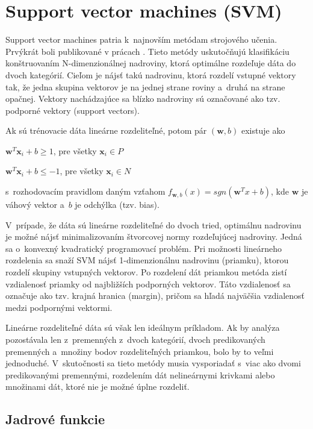 \section {Support vector machines (SVM)}

Support vector machines patria k~najnovším metódam strojového učenia. Prvýkrát boli publikované v prácach \cite{svm} \cite{svm2}. Tieto metódy uskutočňujú klasifikáciu konštruovaním N-dimenzionálnej nadroviny, ktorá optimálne rozdeľuje dáta do dvoch kategórií. Cieľom je nájsť takú nadrovinu, ktorá rozdelí vstupné vektory tak, že jedna skupina vektorov je na jednej strane roviny a~druhá na strane opačnej. Vektory nachádzajúce sa blízko nadroviny sú označované ako tzv. podporné vektory (support vectors). 

Ak sú trénovacie dáta lineárne rozdeliteľné, potom pár $(\textbf{w},b)$ existuje ako 

	$\textbf{w}^{T}\textbf{x}_{i} + b \geq 1$, pre všetky $\textbf{x}_{i} \in P$
	
    $\textbf{w}^{T}\textbf{x}_{i} + b \leq -1$, pre všetky $\textbf{x}_{i} \in N$
    
s~rozhodovacím pravidlom daným vzťahom $f_{\textbf{w},b} ( x ) = sgn(\textbf{w}^{T}x + b )$, kde $\textbf{w}$ je váhový vektor a~$b$ je odchýlka (tzv. bias).

V~prípade, že dáta sú lineárne rozdeliteľné do dvoch tried, optimálnu nadrovinu je možné nájsť minimalizovaním štvorcovej normy rozdeľujúcej nadroviny. Jedná sa o~konvexný kvadratický programovací problém.
Pri možnosti lineárneho rozdelenia sa snaží SVM nájsť 1-dimenzionálnu nadrovinu (priamku), ktorou rozdelí skupiny vstupných vektorov. Po rozdelení dát priamkou metóda zistí vzdialenosť priamky od najbližších podporných vektorov. Táto vzdialenosť sa označuje ako tzv. krajná hranica (margin), pričom sa hľadá najväčšia vzdialenosť medzi podpornými vektormi.  

Lineárne rozdeliteľné dáta sú však len ideálnym príkladom. Ak by analýza pozostávala len z~premenných z~dvoch kategórií, dvoch predikovaných premenných a~množiny bodov rozdeliteľných priamkou, bolo by to veľmi jednoduché. V~skutočnosti sa tieto metódy musia vysporiadať s~viac ako dvomi predikovanými premennými, rozdelením dát nelineárnymi krivkami alebo množinami dát, ktoré nie je možné úplne rozdeliť. 

\subsection{Jadrové funkcie}

